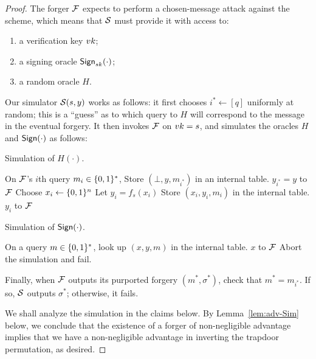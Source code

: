 \documentclass[11pt]{article}
\begin{document}
\begin{proof}
  The forger $\mathcal{F}$ expects to perform a chosen-message attack against
  the scheme, which means that $\mathcal{S}$ must provide it with access to:
  \begin{enumerate}
  \item a verification key $vk$;
  \item a signing oracle $\mathsf{Sign}_{sk}(\cdot)$;
  \item a random oracle $H$.
  \end{enumerate}

  Our simulator $\mathcal{S}(s,y)$ works as follows: it first chooses $i^*
  \gets [q]$ uniformly at random; this is a ``guess'' as to which
  query to $H$ will correspond to the message in the eventual forgery.
  It then invokes $\mathcal{F}$ on $vk = s$, and simulates the oracles $H$
  and $\mathsf{Sign}(\cdot)$ as follows:

  \begin{algorithm}
    \caption{Simulation of $H(\cdot)$.}
    \begin{algorithmic}[1]
      \STATE On $\mathcal{F}$'s $i$th query $m_{i} \in \{0,1\}^{*}$,
      \STATE Store $(\bot, y, m_{i^{*}})$ in an internal table.
      \RETURN $y_{i^*}=y$ to $\mathcal{F}$
      \ELSE 
      \STATE Choose $x_i\gets \{0,1\}^n$
      \STATE Let $y_i=f_s(x_i)$
      \STATE Store $(x_i,y_i,m_i)$ in the internal table.
      \RETURN $y_i$ to $\mathcal{F}$
      \ENDIF
    \end{algorithmic}
  \end{algorithm}

  \begin{algorithm}
  \caption{Simulation of $\mathsf{Sign}(\cdot)$.}
  \begin{algorithmic}[1]
  \STATE On a query $m \in \{0,1\}^{*}$, look up $(x,y,m)$ in the
  internal table.
  \RETURN $x$ to $\mathcal{F}$
  \ELSE
  \STATE Abort the simulation and fail.
  \ENDIF
  \end{algorithmic}
  \end{algorithm}

  Finally, when $\mathcal{F}$ outputs its purported forgery $(m^*,\sigma^*)$,
  check that $m^*=m_{i^*}$.  If so, $\mathcal{S}$ outputs $\sigma^*$;
  otherwise, it fails.

  We shall analyze the simulation in the claims below.  By
  Lemma~\ref{lem:adv-Sim} below, we conclude that the existence of a
  forger of non-negligible advantage implies that we have a
  non-negligible advantage in inverting the trapdoor permutation, as
  desired.
\end{proof}
\end{document}
